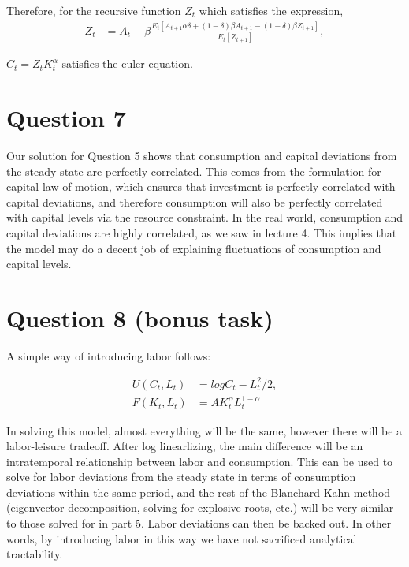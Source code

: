 \documentclass[11pt]{article} %
\begin{document}
Therefore, for the recursive function $Z_t$ which satisfies the expression,
\begin{align*}
 Z_t &= A_t -  \beta \frac{E_t[ A_{t+1}\alpha \delta + (1-\delta)\beta A_{t+1} - (1-\delta)\beta Z_{t+1}]}{E_t[Z_{t+1}]},
\end{align*}

 $C_t = Z_tK_t^{\alpha}$ satisfies the euler equation.

\section{Question 7}
Our solution for Question 5 shows that consumption and capital deviations from the steady state are perfectly correlated. This comes from the formulation for capital law of motion, which ensures that investment is perfectly correlated with capital deviations, and therefore consumption will also be perfectly correlated with capital levels via the resource constraint. In the real world, consumption and capital deviations are highly correlated, as we saw in lecture 4. This implies that the model may do a decent job of explaining fluctuations of consumption and capital levels.

\section{Question 8 (bonus task)}
A simple way of introducing labor follows:

\begin{align*}
U(C_t,L_t) &= log C_t - L_t^{2}/2,\\
F(K_t,L_t) &= AK_t^{\alpha}L_t^{1-\alpha}
\end{align*}

In solving this model, almost everything will be the same, however there will be a labor-leisure tradeoff. After log linearlizing, the main difference will be an intratemporal relationship between labor and consumption. This can be used to solve for labor deviations from the steady state in terms of consumption deviations within the same period, and the rest of the Blanchard-Kahn method (eigenvector decomposition, solving for explosive roots, etc.) will be very similar to those solved for in part 5. Labor deviations can then be backed out. In other words, by introducing labor in this way we have not sacrificed analytical tractability.
\end{document}
